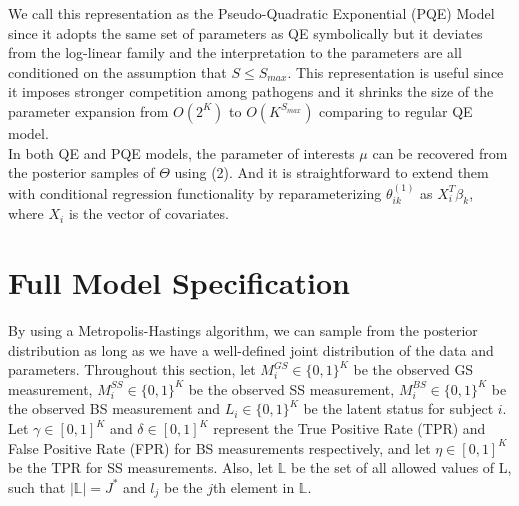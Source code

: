 \documentclass[11 pt, a4paper]{article}  %
\begin{document}
We call this representation as the Pseudo-Quadratic Exponential (PQE) Model since it adopts the same set of parameters as QE symbolically but it deviates from the log-linear family and the interpretation to the parameters are all conditioned on the assumption that $S \leq S_{max}$. This representation is useful since it imposes stronger competition among pathogens and it shrinks the size of the parameter expansion from $O(2^K)$ to $O(K^{S_{max}})$ comparing to regular QE model.\\

In both QE and PQE models, the parameter of interests $\mu$ can be recovered from the posterior samples of $\Theta$ using (2). And it is straightforward to extend them with conditional regression functionality by reparameterizing $\theta^{(1)}_{ik}$ as $X_i^T\beta_k$, where $X_i$ is the vector of covariates.

\section{Full Model Specification}
By using a Metropolis-Hastings algorithm, we can sample from the posterior distribution as long as we have a well-defined joint distribution of the data and parameters. Throughout this section, let $M_i^{GS} \in \{0,1\}^K$ be the observed GS measurement, $M_i^{SS} \in \{0,1\}^K$ be the observed SS measurement, $M_i^{BS} \in \{0,1\}^K$ be the observed BS measurement and $L_i \in \{0,1\}^K$ be the latent status for subject $i$. Let $\gamma \in [0,1]^K$ and $\delta \in [0,1]^K$ represent the True Positive Rate (TPR) and False Positive Rate (FPR) for BS measurements respectively, and let $\eta \in [0,1]^K$ be the TPR for SS measurements. Also, let $\mathbb{L}$ be the set of all allowed values of L, such that $|\mathbb{L}| = J^*$ and $l_j$ be the $j$th element in $\mathbb{L}$.
\end{document}
